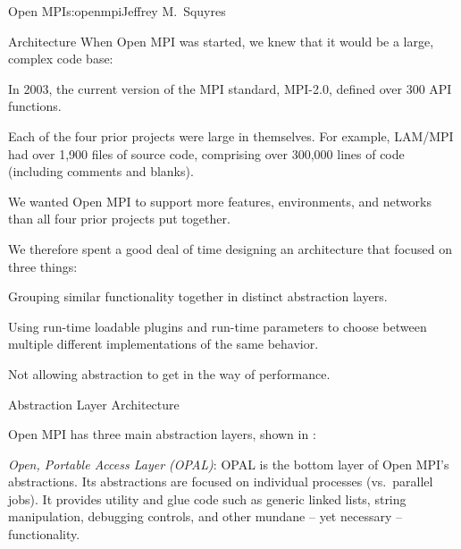 \begin{aosachapter}{Open MPI}{s:openmpi}{Jeffrey M.\ Squyres}
\begin{aosasect1}{Architecture}
When Open MPI was started, we knew that it would be a large, complex
code base:

\begin{aosaitemize}
\item In 2003, the current version of the MPI standard, MPI-2.0,
  defined over 300 API functions.
\item Each of the four prior projects were large in themselves.  For
  example, LAM/MPI had over 1,900 files of source code, comprising
  over 300,000 lines of code (including comments and blanks).
\item We wanted Open MPI to support more features, environments, and
  networks than all four prior projects put together.
\end{aosaitemize}

We therefore spent a good deal of time designing an architecture that
focused on three things:

\begin{aosaenumerate}
\item Grouping similar functionality together in distinct abstraction
  layers.
\item Using run-time loadable plugins and run-time parameters to
  choose between multiple different implementations of the same
  behavior.
\item Not allowing abstraction to get in the way of performance.
\end{aosaenumerate}


\begin{aosasect2}{Abstraction Layer Architecture}


Open MPI has three main abstraction layers, shown in
:

\begin{aosaitemize}
\item {\em Open, Portable Access Layer (OPAL)}: OPAL is the bottom
  layer of Open MPI's abstractions.  Its abstractions are focused on
  individual processes (vs.\ parallel jobs).  It provides utility and
  glue code such as generic linked lists, string manipulation,
  debugging controls, and other mundane -- yet necessary --
  functionality.


\end{aosaitemize}
\end{aosasect2}
\end{aosasect1}
\end{aosachapter}
